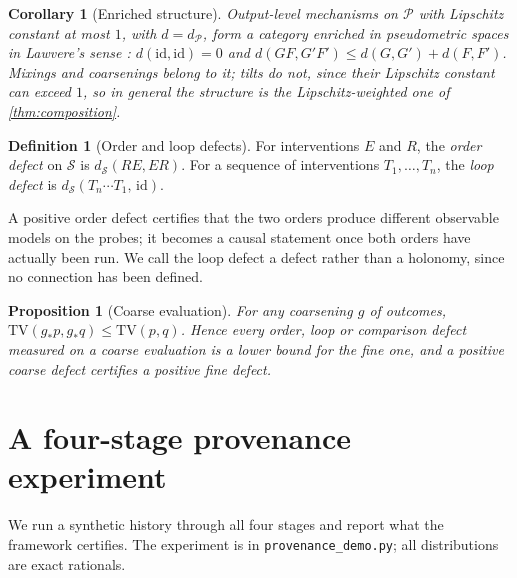 \documentclass[11pt]{article}
\newtheorem{proposition}[theorem]{Proposition}
\newtheorem{corollary}[theorem]{Corollary}
\theoremstyle{definition}
\newtheorem{definition}[theorem]{Definition}
\theoremstyle{remark}
\newcommand{\TV}{\mathrm{TV}}
\newcommand{\cP}{\mathcal{P}}
\newcommand{\cS}{\mathcal{S}}
\begin{document}
\begin{corollary}[Enriched structure]\label{cor:enriched}
Output-level mechanisms on $\cP$ with Lipschitz constant at most $1$, with $d=d_{\cP}$, form a
category enriched in pseudometric spaces in Lawvere's sense \cite{Lawvere1973}:
$d(\mathrm{id},\mathrm{id})=0$ and $d(GF,G'F')\le d(G,G')+d(F,F')$. Mixings and coarsenings belong to it; tilts do not, since their
Lipschitz constant can exceed $1$, so in general the structure is the Lipschitz-weighted one of
\cref{thm:composition}.
\end{corollary}

\begin{definition}[Order and loop defects]
For interventions $E$ and $R$, the \emph{order defect} on $\cS$ is $d_\cS(RE,ER)$. For a sequence
of interventions $T_1,\dots,T_n$, the \emph{loop defect} is $d_\cS(T_n\cdots T_1,\,\mathrm{id})$.
\end{definition}

A positive order defect certifies that the two orders produce different observable models on the
probes; it becomes a causal statement once both orders have actually been run. We call the loop defect
a defect rather than a holonomy, since no connection has been defined.

\begin{proposition}[Coarse evaluation]\label{prop:coarse}
For any coarsening $g$ of outcomes, $\TV(g_*p,g_*q)\le\TV(p,q)$. Hence every order, loop or comparison
defect measured on a coarse evaluation is a lower bound for the fine one, and a positive coarse defect
certifies a positive fine defect.
\end{proposition}

\section{A four-stage provenance experiment}\label{sec:demo}

We run a synthetic history through all four stages and report what the framework certifies. The
experiment is in \texttt{provenance\_demo.py}; all distributions are exact rationals.
\end{document}
